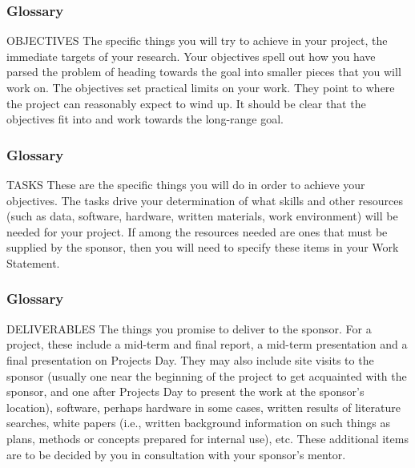\begin{frame}
    \frametitle{Glossary}
    \begin{block}
        {OBJECTIVES} The specific things you will try to achieve in your project, the
immediate targets of your research. Your objectives spell out how you have
parsed the problem of heading towards the goal into smaller pieces that you
will work on. The objectives set practical limits on your work. They point to
where the project can reasonably expect to wind up. It should be clear that
the objectives fit into and work towards the long-range goal.
\end{block}
\end{frame}

\begin{frame}
    \frametitle{Glossary}
\begin{block}
        {TASKS} These are the specific things you will do in order to achieve your
objectives. The tasks drive your determination of what skills and other
resources (such as data, software, hardware, written materials, work
environment) will be needed for your project. If among the resources needed
are ones that must be supplied by the sponsor, then you will need to specify
these items in your Work Statement.
\end{block}
    
\end{frame}


\begin{frame}
    \frametitle{Glossary}
\begin{block}
        {DELIVERABLES} The things you promise to deliver to the sponsor. For a 
project, these include a mid-term and final report, a mid-term presentation
and a final presentation on Projects Day. They may also include site visits to
the sponsor (usually one near the beginning of the project to get acquainted
with the sponsor, and one after Projects Day to present the work at the
sponsor's location), software, perhaps hardware in some cases, written results
of literature searches, white papers (i.e., written background information on
such things as plans, methods or concepts prepared for internal use), etc.
These additional items are to be decided by you in consultation with your
sponsor’s mentor.
\end{block}
    
\end{frame}


